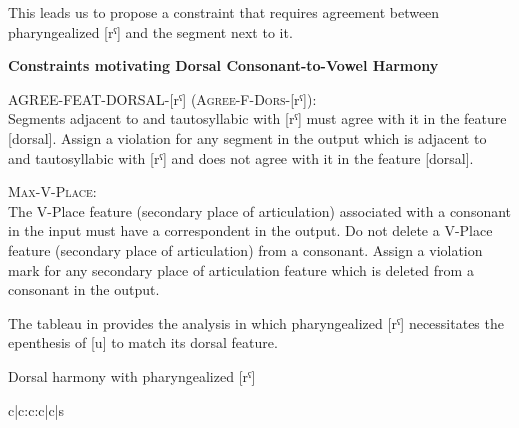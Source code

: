 \documentclass[output=paper,colorlinks,citecolor=brown]{langscibook}
\begin{document}
This leads us to propose a constraint that requires agreement between pharyngealized [rˤ]  and the segment next to it.

\largerpage
\begin{exe} 
\ex \label{constr2} \textbf{Constraints motivating Dorsal Consonant-to-Vowel Harmony}
    \begin{xlist}
        \ex AGREE-FEAT-DORSAL-[rˤ] (\textsc{Agree-F-Dors}-[rˤ]): \\
            Segments adjacent to and tautosyllabic with [rˤ] must agree with it in the feature [dorsal]. Assign a violation for any segment in the output which is adjacent to and tautosyllabic with [rˤ] and does not agree with it in the feature [dorsal].

          \ex  \textsc{Max-V-Place}:\\
            The V-Place feature (secondary place of articulation) associated with a consonant in the input must have a correspondent in the output. Do not delete a V-Place feature (secondary place of articulation) from a consonant. Assign a violation mark for any secondary place of articulation feature which is deleted from a consonant in the output.
    \end{xlist}
\end{exe}
 
The tableau in  provides the analysis in which pharyngealized [rˤ] necessitates the epenthesis of [u] to  match its dorsal feature.


\begin{table}
\caption{Dorsal harmony with pharyngealized [rˤ]}
\label{tab:dor}
\ShadingOn
\begin{tableau}{c|c:c:c|c|s} 
      \const*{\rotatebox{90}{*O2L1]σ}}      

\cand{[ʤadrˤ]}
\vio{*!}  \vio{}  \vio{}    \vio{}     \vio{*}    \vio{}

\cand{[ʤadr]}
\vio{*!}  \vio{*}  \vio{}    \vio{}     \vio{}    \vio{}

\cand[\Optimal]{[ʤa.durˤ]}
\vio{}  \vio{}  \vio{*}    \vio{*}     \vio{}    \vio{*}  

\cand{[ʤa.dur]}
\vio{}  \vio{*!}  \vio{*}    \vio{*}     \vio{}    \vio{*}  

\cand{[ʤa.dir]}
\vio{}  \vio{*!}  \vio{*}    \vio{*}     \vio{}    \vio{}  

\cand{[ʤa.dirˤ]}
\vio{}  \vio{}  \vio{*}    \vio{*}     \vio{*!}    \vio{}  

\end{tableau}
\end{table}
\end{document}
